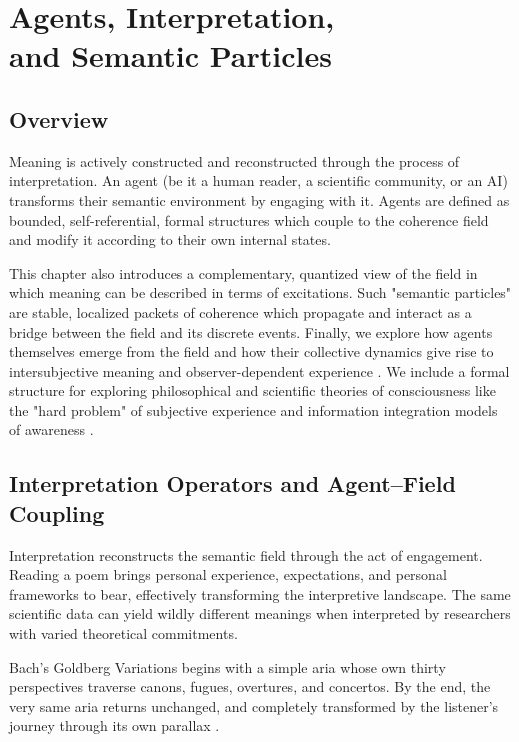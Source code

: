 \chapter{Agents, Interpretation, \\ and Semantic Particles}

\section{Overview}

Meaning is actively constructed and reconstructed through the process of interpretation. An agent (be it a human reader, a scientific community, or an AI) transforms their semantic environment by engaging with it. Agents are defined as bounded, self-referential, formal structures which couple to the coherence field and modify it according to their own internal states.

This chapter also introduces a complementary, quantized view of the field in which meaning can be described in terms of excitations. Such "semantic particles" are stable, localized packets of coherence which propagate and interact as a bridge between the field and its discrete events. Finally, we explore how agents themselves emerge from the field and how their collective dynamics give rise to intersubjective meaning and observer-dependent experience \autocite{Wheeler1990, vonNeumann1955}. We include a formal structure for exploring philosophical and scientific theories of consciousness like the "hard problem" of subjective experience and information integration models of awareness \autocite{Chalmers1996, Tononi2004}.

\section{Interpretation Operators and Agent–Field Coupling}

Interpretation reconstructs the semantic field through the act of engagement. Reading a poem brings personal experience, expectations, and personal frameworks to bear, effectively transforming the interpretive landscape. The same scientific data can yield wildly different meanings when interpreted by researchers with varied theoretical commitments.

Bach's Goldberg Variations begins with a simple aria whose own thirty perspectives traverse canons, fugues, overtures, and concertos. By the end, the very same aria returns unchanged, and completely transformed by the listener's journey through its own parallax \autocite{Bach1741}.

